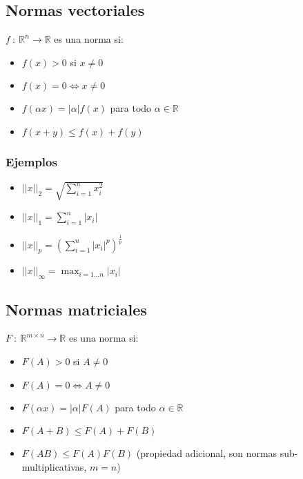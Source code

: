 \subsection{Normas vectoriales}\label{subsec:normas_vectoriales}

$f~:~\mathbb{R}^{n}\to\mathbb{R}$ es una norma si:

\begin{itemize}
    \item $f(x) > 0$ si $x \neq 0$
    \item $f(x) = 0 \iff x \neq 0$ 
    \item $f(\alpha x) = |\alpha|f(x)$ para todo $\alpha \in \mathbb{R}$
    \item $f(x + y) \leq f(x) + f(y)$
\end{itemize}

\subsubsection{Ejemplos}\label{subsubsec:normas_vectoriales_ejemplos}

\begin{itemize}
    \item ${||x||}_{2} = \sqrt{\sum_{i = 1}^{n}x_{i}^{2}}$
    \item ${||x||}_{1} = \sum_{i = 1}^{n}|x_{i}|$
    \item ${||x||}_{p} = {(\sum_{i = 1}^{n}{|x_{i}|}^{p})}^{\frac{1}{p}}$
    \item ${||x||}_{\infty} = \max_{i=1\ldots n} |x_i|$
\end{itemize}

\subsection{Normas matriciales}\label{subsec:normas_matriciales}

$F~:~\mathbb{R}^{m \times n}\to\mathbb{R}$ es una norma si:

\begin{itemize}
    \item $F(A) > 0$ si $A \neq 0$
    \item $F(A) = 0 \iff A \neq 0$ 
    \item $F(\alpha x) = |\alpha|F(A)$ para todo $\alpha \in \mathbb{R}$
    \item $F(A + B) \leq F(A) + F(B)$
    \item $F(AB) \leq F(A)F(B)$ (propiedad adicional, son normas sub-multiplicativas, $m = n$)
\end{itemize}

